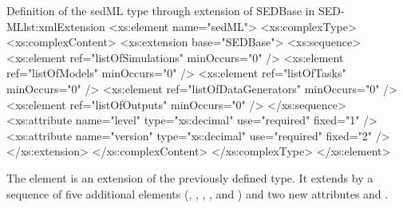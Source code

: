 \begin{myXmlLst}{Definition of the sedML type through extension of SEDBase in SED-ML}{lst:xmlExtension}
<xs:element name="sedML">
	<xs:complexType>
		<xs:complexContent>
			<xs:extension base="SEDBase">
				<xs:sequence>
					<xs:element ref="listOfSimulations" minOccurs="0" />
					<xs:element ref="listOfModels" minOccurs="0" />
					<xs:element ref="listOfTasks" minOccurs="0" />
					<xs:element ref="listOfDataGenerators" minOccurs="0" />
					<xs:element ref="listOfOutputs" minOccurs="0" />
				</xs:sequence>
				<xs:attribute name="level" type="xs:decimal" use="required"
					fixed="1" />
				<xs:attribute name="version" type="xs:decimal" use="required"
					fixed="2" />
			</xs:extension>
		</xs:complexContent>
	</xs:complexType>
</xs:element>
\end{myXmlLst}

The  element is an extension of the previously defined  type. It extends  by a sequence of five additional elements (, , , , and ) and two new attributes  and .
